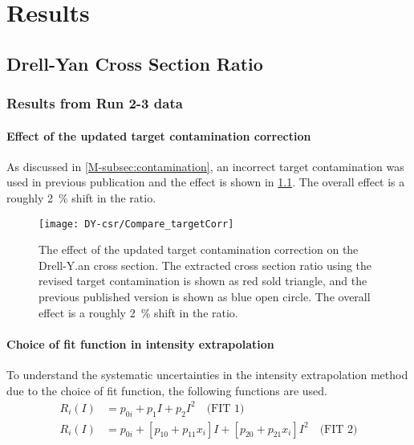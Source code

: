 \documentclass[../main.tex]{subfiles}
\begin{document}
\ifSubfilesClassLoaded{
	\mainmatter
	\setcounter{chapter}{5}
}{}

\chapter{Results}
\label{ch:result}
\section{Drell-Yan Cross Section Ratio}
\subsection{Results from Run 2-3 data}
\subsubsection{Effect of the updated target contamination correction}
As discussed in \cref{M-subsec:contamination}, an incorrect target contamination was used
in previous publication and the effect is shown in \cref{fig:contaimination_CSR}.
The overall effect is a roughly \SI{2}{\percent} shift in the ratio.
\begin{figure}[h!]
	\centering
	\texttt{[image: DY-csr/Compare\_targetCorr]}
	\caption{The effect of the updated target contamination correction on the Drell-Y.an
		cross section. The extracted cross section ratio using the revised target contamination
		is shown as red sold triangle, and the previous published version is shown as blue open
		circle. The overall effect is a roughly \SI{2}{\percent} shift in the ratio. }
	\label{fig:contaimination_CSR}
\end{figure}



\subsubsection{Choice of fit function in intensity extrapolation}
To understand the systematic uncertainties in the intensity extrapolation method due to the
choice of fit function, the following functions are used.
\begin{align}
	R_i\left(I\right) &= p_{0i} + p_{1} I + p_{2} I^2 \quad\text{(FIT 1)}\\
	R_i\left(I\right) &= p_{0i} + \left[p_{10} + p_{11}x_i\right] I + \left[p_{20} + p_{21}x_i\right]I^2 \quad \text{(FIT 2)}
\end{align}
\end{document}
